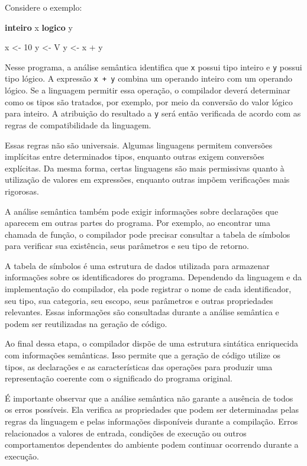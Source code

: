 \documentclass[
  brazilian,
  letterpaper,
]{book}
\newenvironment{Shaded}{\begin{snugshade}}{\end{snugshade}}
\newcommand{\DecValTok}[1]{\textcolor[rgb]{0.68,0.00,0.00}{#1}}
\newcommand{\KeywordTok}[1]{\textcolor[rgb]{0.00,0.23,0.31}{\textbf{#1}}}
\newcommand{\NormalTok}[1]{\textcolor[rgb]{0.00,0.23,0.31}{#1}}
\theoremstyle{plain}
\theoremstyle{definition}
\theoremstyle{remark}
\begin{document}
Considere o exemplo:

\begin{Shaded}
\begin{Highlighting}[]
\KeywordTok{inteiro}\NormalTok{ x}
\KeywordTok{logico}\NormalTok{ y}

\NormalTok{x \textless{}{-} }\DecValTok{10}
\NormalTok{y \textless{}{-} V}
\NormalTok{y \textless{}{-} x + y}
\end{Highlighting}
\end{Shaded}

Nesse programa, a análise semântica identifica que \texttt{x} possui
tipo inteiro e \texttt{y} possui tipo lógico. A expressão
\texttt{x\ +\ y} combina um operando inteiro com um operando lógico. Se
a linguagem permitir essa operação, o compilador deverá determinar como
os tipos são tratados, por exemplo, por meio da conversão do valor
lógico para inteiro. A atribuição do resultado a \texttt{y} será então
verificada de acordo com as regras de compatibilidade da linguagem.

Essas regras não são universais. Algumas linguagens permitem conversões
implícitas entre determinados tipos, enquanto outras exigem conversões
explícitas. Da mesma forma, certas linguagens são mais permissivas
quanto à utilização de valores em expressões, enquanto outras impõem
verificações mais rigorosas.

A análise semântica também pode exigir informações sobre declarações que
aparecem em outras partes do programa. Por exemplo, ao encontrar uma
chamada de função, o compilador pode precisar consultar a tabela de
símbolos para verificar sua existência, seus parâmetros e seu tipo de
retorno.

A tabela de símbolos é uma estrutura de dados utilizada para armazenar
informações sobre os identificadores do programa. Dependendo da
linguagem e da implementação do compilador, ela pode registrar o nome de
cada identificador, seu tipo, sua categoria, seu escopo, seus parâmetros
e outras propriedades relevantes. Essas informações são consultadas
durante a análise semântica e podem ser reutilizadas na geração de
código.

Ao final dessa etapa, o compilador dispõe de uma estrutura sintática
enriquecida com informações semânticas. Isso permite que a geração de
código utilize os tipos, as declarações e as características das
operações para produzir uma representação coerente com o significado do
programa original.

É importante observar que a análise semântica não garante a ausência de
todos os erros possíveis. Ela verifica as propriedades que podem ser
determinadas pelas regras da linguagem e pelas informações disponíveis
durante a compilação. Erros relacionados a valores de entrada, condições
de execução ou outros comportamentos dependentes do ambiente podem
continuar ocorrendo durante a execução.
\end{document}
